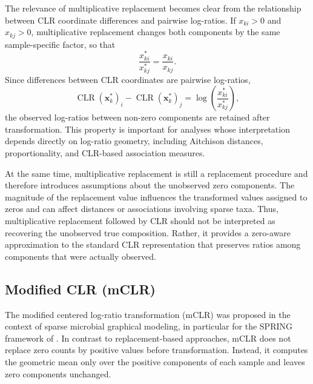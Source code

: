 The relevance of multiplicative replacement becomes clear from the relationship between CLR coordinate differences and pairwise log-ratios. If $x_{ki}>0$ and $x_{kj}>0$, multiplicative replacement changes both components by the same sample-specific factor, so that
\begin{equation}
\frac{x_{ki}^\ast}{x_{kj}^\ast}=\frac{x_{ki}}{x_{kj}}.
\label{eq:2micro:mult_replacement_ratio_preservation}
\end{equation}
Since differences between CLR coordinates are pairwise log-ratios,
\begin{equation}
\operatorname{CLR}(\mathbf{x}_k^\ast)_i-\operatorname{CLR}(\mathbf{x}_k^\ast)_j
=
\log\left(\frac{x_{ki}^\ast}{x_{kj}^\ast}\right),
\label{eq:2micro:clr_difference_logratio}
\end{equation}
the observed log-ratios between non-zero components are retained after transformation. This property is important for analyses whose interpretation depends directly on log-ratio geometry, including Aitchison distances, proportionality, and CLR-based association measures.

At the same time, multiplicative replacement is still a replacement procedure and therefore introduces assumptions about the unobserved zero components. The magnitude of the replacement value influences the transformed values assigned to zeros and can affect distances or associations involving sparse taxa. Thus, multiplicative replacement followed by CLR should not be interpreted as recovering the unobserved true composition. Rather, it provides a zero-aware approximation to the standard CLR representation that preserves ratios among components that were actually observed.

\subsection{Modified CLR (mCLR)} 
\label{sec:2micro:clr_with_zeros:mCLR}

The modified centered log-ratio transformation (mCLR) was proposed in the context of sparse microbial graphical modeling, in particular for the SPRING framework of \citet{yoon2019microbial}. In contrast to replacement-based approaches, mCLR does not replace zero counts by positive values before transformation. Instead, it computes the geometric mean only over the positive components of each sample and leaves zero components unchanged.

